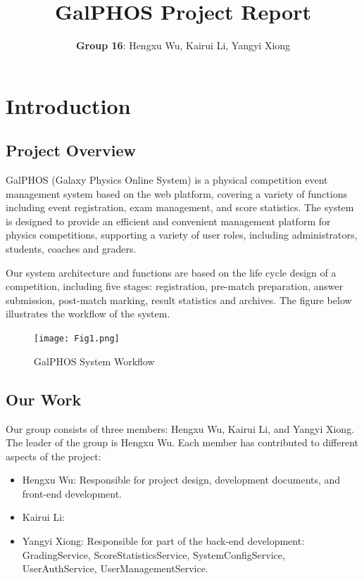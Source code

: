 \documentclass[12pt]{article}
\title{GalPHOS Project Report}
\author{\textbf{Group 16}: Hengxu Wu, Kairui Li, Yangyi Xiong}
\date{}
\begin{document}
\maketitle

\section{Introduction}
\subsection{Project Overview}

GalPHOS (Galaxy Physics Online System) is a physical competition event management system based on the web platform, covering a variety of functions including event registration, exam management, and score statistics. The system is designed to provide an efficient and convenient management platform for physics competitions, supporting a variety of user roles, including administrators, students, coaches and graders.

Our system architecture and functions are based on the life cycle design of a competition, including five stages: registration, pre-match preparation, answer submission, post-match marking, result statistics and archives. The figure below illustrates the workflow of the system.
\begin{figure}[H]
    \centering
    \texttt{[image: Fig1.png]}
    \caption{GalPHOS System Workflow}
    \label{fig:workflow}
\end{figure}

\subsection{Our Work}

Our group consists of three members: Hengxu Wu, Kairui Li, and Yangyi Xiong. The leader of the group is Hengxu Wu. Each member has contributed to different aspects of the project:
\begin{itemize}
    \item Hengxu Wu: Responsible for project design, development documents, and front-end development.
    \item Kairui Li: %
    \item Yangyi Xiong: Responsible for part of the back-end development: GradingService, ScoreStatisticsService, SystemConfigService, UserAuthService, UserManagementService.
\end{itemize}
\end{document}
